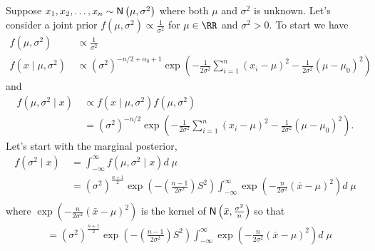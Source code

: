 \begin{exam} \label{exam: bay_norm_4}
    Suppose $x_1 , x_2 , \ldots , x_n \sim {\sf N} \left( \mu , \sigma^2 \right)$ where both $\mu$ and $\sigma^{2}$ is unknown. Let's consider a joint prior $f (\mu , \sigma^2) \propto \frac{1}{\sigma^2}$ for $\mu \in \RR$ and $\sigma^2 > 0$. To start we have
    \begin{align*}
        f (\mu , \sigma^2) \
         & \propto \frac{1}{\sigma^2}                                                                                                                                                        \\
        f(x \mid \mu , \sigma^2) \
         & \propto \left( \sigma^{2} \right)^{-n/2 + \alpha_0 + 1} \exp \left( - \frac{1}{2\sigma^2} \sum_{i=1}^{n} (x_i - \mu)^2 - \frac{1}{2\sigma^2} \left( \mu - \mu_0 \right)^2 \right)
    \end{align*}
    and
    \begin{align*}
        f (\mu , \sigma^2 \mid x) \
         & \propto f(x \mid \mu , \sigma^2) f (\mu , \sigma^2)                                                                                                           \\
         & = \left( \sigma^{2} \right)^{-n/2} \exp \left( - \frac{1}{2\sigma^2} \sum_{i=1}^{n} (x_i - \mu)^2 - \frac{1}{2\sigma^2} \left( \mu - \mu_0 \right)^2 \right).
    \end{align*}
    Let's start with the marginal posterior,
    \begin{align*}
        f (\sigma^2 \mid x) \
         & = \int_{-\infty}^{\infty} f(\mu , \sigma^2 \mid x) d \; \mu                                                                                                                   \\
         & = (\sigma^2)^{\frac{n+1}{2}} \exp \left( - (\frac{n-1}{2 \sigma^2})S^2 \right)  \int_{-\infty}^{\infty} \exp \left( - \frac{n}{2 \sigma^2} (\bar{x} - \mu)^2 \right) d \; \mu \\
    \end{align*}
    where $\exp \left( - \frac{n}{2 \sigma^2} (\bar{x} - \mu)^2 \right)$ is the kernel of ${\sf N} \left( \bar{x}, \frac{\sigma^2}{n} \right)$ so that
    \begin{align*}
         & = (\sigma^2)^{\frac{n+1}{2}} \exp \left( - (\frac{n-1}{2 \sigma^2})S^2 \right)  \int_{-\infty}^{\infty} \exp \left( - \frac{n}{2 \sigma^2} (\bar{x} - \mu)^2 \right) d \; \mu \\

\end{align*}
\end{exam}
